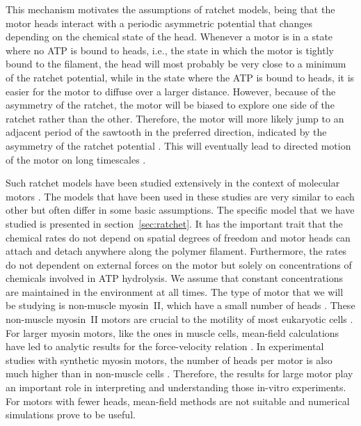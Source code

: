 \documentclass[aps,pre,twocolumn,showpacs,showkeys,superscriptaddress,floatfix]{revtex4-1}
\begin{document}
This mechanism motivates the assumptions of ratchet models, 
being that the motor heads interact with a periodic asymmetric potential that changes depending on the chemical state of the head. 
Whenever a motor is in a state where no ATP is bound to heads, i.e., the state in which the motor is tightly bound to the filament, 
the head will most probably be very close to a minimum of the ratchet potential, 
while in the state where the ATP is bound to heads, it is easier for the motor to diffuse over a larger distance. 
However, because of the asymmetry of the ratchet, the motor will be biased to explore one side of the ratchet rather than the other. 
Therefore, the motor will more likely jump to an adjacent period of the sawtooth in the preferred direction, indicated by the asymmetry of the ratchet potential \cite{reimann2002brownian}.
This will eventually lead to directed motion of the motor on long timescales \cite{hoffmann2016molecular,Reimann2002introduction,de2007symmetries}. 

Such ratchet models have been studied extensively in the context of molecular motors \cite{reimann2002brownian,astumian1994fluctuation,astumian1996mechanochemical,julicher1997modeling,Reimann2002introduction,julicher1997spontaneous,peskin1995correlation,huxley1969mechanism,huxley1971proposed}.
The models that have been used in these studies are very similar to each other but often differ in some basic assumptions.
The specific model that we have studied is presented in section~\ref{sec:ratchet}. 
It has the important trait that the chemical rates do not depend on spatial degrees of freedom and motor heads can attach and detach anywhere along the polymer filament.
Furthermore, the rates do not dependent on external forces on the motor but solely on concentrations of chemicals involved in ATP hydrolysis. 
We assume that constant concentrations are maintained in the environment at all times. 
The type of motor that we will be studying is non-muscle myosin~II, which have a small number of heads \cite{pollard1982structure}. 
These non-muscle myosin~II motors are crucial to the motility of most eukaryotic cells \cite{vicente2009non}.
For larger myosin motors, like the ones in muscle cells, mean-field calculations have led to analytic results for the force-velocity relation \cite{julicher1997modeling}.
In experimental studies with synthetic myosin motors, the number of heads per motor is also much higher than in non-muscle cells \cite{brown2009cross-correlated}.
Therefore, the results for large motor play an important role in interpreting and understanding those in-vitro experiments.
For motors with fewer heads, mean-field methods are not suitable and numerical simulations prove to be useful.
\end{document}
